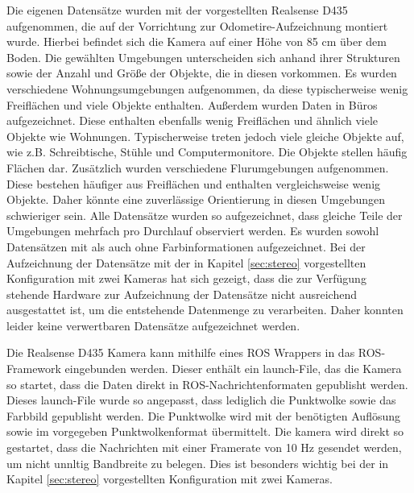 Die eigenen Datensätze wurden mit der vorgestellten Realsense D435 aufgenommen, die auf der Vorrichtung zur Odometire-Aufzeichnung montiert wurde. Hierbei befindet sich die Kamera auf einer Höhe von 85 cm über dem Boden. Die gewählten Umgebungen unterscheiden sich anhand ihrer Strukturen sowie der Anzahl und Größe der Objekte, die in diesen vorkommen. Es wurden verschiedene Wohnungsumgebungen aufgenommen, da diese  typischerweise wenig Freiflächen und viele Objekte enthalten. Außerdem wurden Daten in Büros aufgezeichnet. Diese enthalten ebenfalls wenig Freiflächen und ähnlich viele Objekte wie Wohnungen. Typischerweise treten jedoch viele gleiche Objekte auf, wie z.B. Schreibtische, Stühle und Computermonitore. Die Objekte stellen häufig Flächen dar. Zusätzlich wurden verschiedene Flurumgebungen aufgenommen.  Diese bestehen häufiger aus Freiflächen und enthalten vergleichsweise wenig Objekte. Daher könnte eine  zuverlässige Orientierung in diesen Umgebungen schwieriger sein. Alle Datensätze wurden so aufgezeichnet, dass gleiche Teile der Umgebungen mehrfach pro Durchlauf observiert werden. Es wurden sowohl Datensätzen mit als auch ohne Farbinformationen aufgezeichnet. Bei der Aufzeichnung der Datensätze mit der in Kapitel \ref{sec:stereo} vorgestellten Konfiguration mit zwei Kameras hat sich gezeigt, dass die zur Verfügung stehende Hardware zur Aufzeichnung der Datensätze nicht ausreichend ausgestattet ist, um die entstehende Datenmenge zu verarbeiten. Daher konnten leider keine verwertbaren Datensätze aufgezeichnet werden.
 
Die Realsense D435 Kamera kann mithilfe eines ROS Wrappers in das ROS-Framework eingebunden werden. Dieser enthält ein launch-File, das die Kamera so startet, dass die Daten direkt in ROS-Nachrichtenformaten gepublisht werden. Dieses launch-File wurde so angepasst, dass lediglich die Punktwolke sowie das Farbbild gepublisht werden. Die Punktwolke wird mit der benötigten Auflösung sowie im vorgegeben Punktwolkenformat übermittelt. Die kamera wird direkt so gestartet, dass die Nachrichten mit einer Framerate von 10 Hz gesendet werden, um nicht unnltig Bandbreite zu belegen. Dies ist besonders wichtig bei der in Kapitel \ref{sec:stereo} vorgestellten Konfiguration mit zwei Kameras. 

